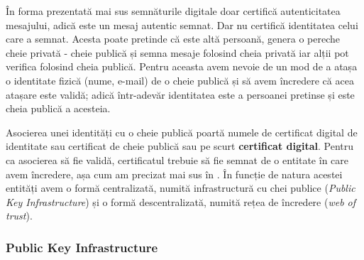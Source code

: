 În forma prezentată mai sus semnăturile digitale doar certifică autenticitatea mesajului, adică este un mesaj autentic semnat. Dar nu certifică identitatea celui care a semnat. Acesta poate pretinde că este altă persoană, genera o pereche cheie privată - cheie publică și semna mesaje folosind cheia privată iar alții pot verifica folosind cheia publică. Pentru aceasta avem nevoie de un mod de a atașa o identitate fizică (nume, e-mail) de o cheie publică și să avem încredere că acea atașare este validă; adică într-adevăr identitatea este a persoanei pretinse și este cheia publică a acesteia.

Asocierea unei identități cu o cheie publică poartă numele de certificat digital de identitate sau certificat de cheie publică sau pe scurt \textbf{certificat digital}. Pentru ca asocierea să fie validă, certificatul trebuie să fie semnat de o entitate în care avem încredere, așa cum am precizat mai sus în . În funcție de natura acestei entități avem o formă centralizată, numită infrastructură cu chei publice (\textit{Public Key Infrastructure}) și o formă descentralizată, numită rețea de încredere (\textit{web of trust}).

\subsubsection{Public Key Infrastructure}
\label{sec:sec:transfer:sign:pki}

